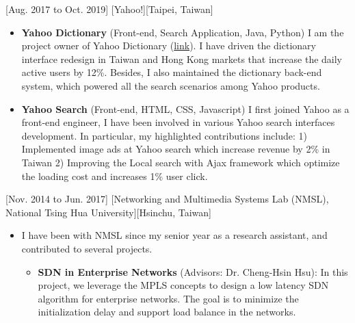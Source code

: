 \documentclass{article}
\begin{document}
[Aug. 2017 to Oct. 2019]
[Yahoo!][Taipei, Taiwan]
\begin{itemize}
\item \textbf{Yahoo Dictionary} (Front-end, Search Application, Java, Python) I am the project owner of Yahoo Dictionary (\href{https://tw.dictionary.search.yahoo.com/}{link}). I have driven the dictionary interface redesign in Taiwan and Hong Kong markets that increase the daily active users by 12\%. Besides, I also maintained the dictionary back-end system, which powered all the search scenarios among Yahoo products.
\item \textbf{Yahoo Search} (Front-end, HTML, CSS, Javascript) I first joined Yahoo as a front-end engineer, I have been involved in various Yahoo search interfaces development. In particular, my highlighted contributions include: 1) Implemented image ads at Yahoo search which increase revenue by 2\% in Taiwan 2) Improving the Local search with Ajax framework which optimize the loading cost and increases 1\% user click. %
\end{itemize}

[Nov. 2014 to Jun. 2017]
[Networking and Multimedia Systems Lab (NMSL), National Tsing Hua University][Hsinchu, Taiwan]
\begin{itemize}
\item I have been with NMSL since my senior year as a research assistant, and contributed to several projects. \begin{itemize}
\item \textbf{SDN in Enterprise Networks} (Advisors:  Dr. Cheng-Hsin Hsu): In this project, we leverage the MPLS concepts to design a low latency SDN algorithm for enterprise networks. The goal is to minimize the initialization delay and support load balance in the networks.
\end{itemize}
\end{itemize}

\end{document}
